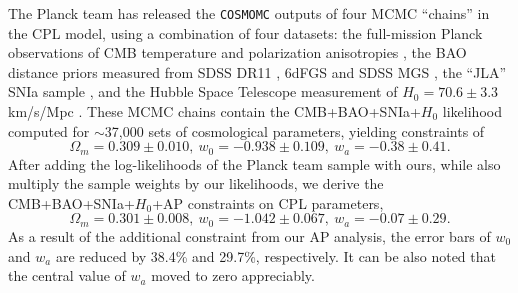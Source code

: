\documentclass[iop]{emulateapj}
\begin{document}
The Planck team has released the {\texttt {COSMOMC}} \citep{LB2002} outputs of four MCMC ``chains'' in the CPL model, 
using a combination of four datasets:
the full-mission Planck observations of CMB temperature and polarization anisotropies \cite{Planck2015},
the BAO distance priors measured from SDSS DR11 \citep{Anderson2013}, 6dFGS \citep{6dFGS} and SDSS MGS \citep{MGS},
the ``JLA'' SNIa sample \citep{JLA},
and the Hubble Space Telescope measurement of $H_0=70.6\pm3.3$ km/s/Mpc \cite{Riess2011,E14H0}.
These MCMC chains contain the CMB+BAO+SNIa+$H_0$ likelihood computed for $\sim$37,000 sets of cosmological parameters,
yielding constraints of %
\small
\begin{equation}
 \Omega_m = 0.309 \pm 0.010,\
 w_0 = -0.938 \pm 0.109,\
 w_a = -0.38 \pm 0.41.
\end{equation}
\normalsize
After adding the log-likelihoods of the Planck team sample with ours, 
while also multiply the sample weights by our likelihoods, 
we derive the CMB+BAO+SNIa+$H_0$+AP constraints on CPL parameters, %
\small
\begin{equation}
 \Omega_m = 0.301 \pm 0.008,\
 w_0 = -1.042 \pm 0.067,\
 w_a = -0.07 \pm 0.29.
\end{equation}
\normalsize
As a result of the additional constraint from our AP analysis,
the error bars of $w_0$ and $w_a$ are reduced by 38.4\% and 29.7\%, respectively.%
It can be also noted that the central value of $w_a$ moved to zero appreciably.
\end{document}

